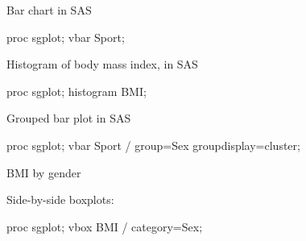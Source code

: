 \documentclass[unknownkeysallowed]{beamer}\usepackage[]{graphicx}\usepackage[]{color}
\begin{document}
\begin{frame}[fragile]{Bar chart in SAS}
  
  \begin{Sascode}[store=gd]
proc sgplot;
  vbar Sport;
  \end{Sascode}
  
  
\end{frame}

\begin{frame}[fragile]{Histogram of body mass index, in SAS}
  
  \begin{Sascode}[store=ge]
proc sgplot;
  histogram BMI;
  \end{Sascode}
  

  
\end{frame}


\begin{frame}[fragile]{Grouped bar plot in SAS}
  
  \begin{Sascode}[store=gf]
proc sgplot;
  vbar Sport / group=Sex groupdisplay=cluster;
  \end{Sascode}
  
  
\end{frame}

\begin{frame}[fragile]{BMI by gender}
  
  Side-by-side boxplots:
  
  \begin{Sascode}[store=gg]
proc sgplot;
  vbox BMI / category=Sex;
  \end{Sascode}
  
  
\end{frame}
\end{document}
